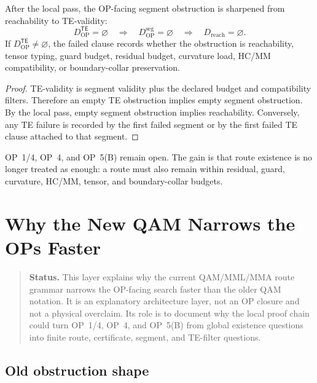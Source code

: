\begin{theorem}
\label{thm:v410r16-te-filter-reduction}
After the local pass, the OP-facing segment obstruction is sharpened from reachability to
TE-validity:
\[
 D_{\mathrm{OP}}^{\mathsf{TE}}=\varnothing
 \quad\Longrightarrow\quad
 D_{\mathrm{OP}}^{\mathrm{seg}}=\varnothing
 \quad\Longrightarrow\quad
 D_{\mathrm{reach}}=\varnothing.
\]
If \(D_{\mathrm{OP}}^{\mathsf{TE}}\neq\varnothing\), the failed clause records
whether the obstruction is reachability, tensor typing, guard budget, residual
budget, curvature load, HC/MM compatibility, or boundary-collar preservation.
\end{theorem}

\begin{proof}
TE-validity is segment validity plus the declared budget and compatibility
filters. Therefore an empty TE obstruction implies empty segment obstruction.
By the local pass, empty segment obstruction implies reachability. Conversely, any TE
failure is recorded by the first failed segment or by the first failed TE clause
attached to that segment.
\end{proof}

\begin{remark}
\label{rem:v410r16-op-status}
OP~1/4, OP~4, and OP~5(B) remain open. The gain is that route existence is no
longer treated as enough: a route must also remain within residual, guard,
curvature, HC/MM, tensor, and boundary-collar budgets.
\end{remark}



\clearpage
\section{Why the New QAM Narrows the OPs Faster}
\label{sec:v410r17-why-new-qam-narrows-faster}

\begin{quote}\small
\noindent\textbf{Status.}
This layer explains why the current QAM/MML/MMA route grammar narrows the
OP-facing search faster than the older QAM notation. It is an explanatory
architecture layer, not an OP closure and not a physical overclaim. Its role is
to document why the local proof chain could turn OP~1/4, OP~4, and OP~5(B) from global
existence questions into finite route, certificate, segment, and TE-filter
questions.
\end{quote}

\subsection{Old obstruction shape}
\label{subsec:v410r17-old-obstruction-shape}

